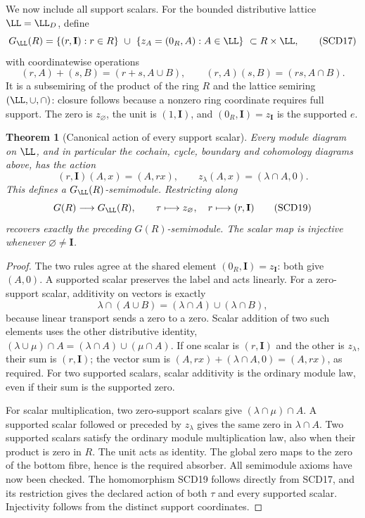 \documentclass[11pt,a4paper]{article}
\newtheorem{theorem}{Theorem}[section]
\theoremstyle{definition}\newtheorem{definition}[theorem]{Definition}
\begin{document}
We now include all support scalars. For the bounded distributive
lattice \(\LL=\LL_D\), define
\[
 G_{\LL}(R)
 =\{(r,\mathbf I):r\in R\}\ \cup\
   \{z_A=(0_R,A):A\in\LL\}\ \subset R\times\LL,
 \tag{SCD17}
\]
with coordinatewise operations
\[
 (r,A)+(s,B)=(r+s,A\cup B),\qquad
 (r,A)(s,B)=(rs,A\cap B).
\]
It is a subsemiring of the product of the ring \(R\) and the lattice
semiring \((\LL,\cup,\cap)\): closure follows because a nonzero
ring coordinate requires full support. The zero is \(z_\varnothing\),
the unit is \((1,\mathbf I)\), and
\((0_R,\mathbf I)=z_{\mathbf I}\) is the supported \(e\).

\begin{theorem}[Canonical action of every support scalar]
Every module diagram on \(\LL\), and in particular the cochain,
cycle, boundary and cohomology diagrams above, has the action
\[
 (r,\mathbf I)(A,x)=(A,rx),\qquad
 z_\lambda(A,x)=(\lambda\cap A,0).
 \tag{SCD18}
\]
This defines a \(G_{\LL}(R)\)-semimodule. Restricting along
\[
 G(R)\longrightarrow G_{\LL}(R),\qquad
 \tau\longmapsto z_\varnothing,\quad
 r\longmapsto(r,\mathbf I)
 \tag{SCD19}
\]
recovers exactly the preceding \(G(R)\)-semimodule.
The scalar map is injective whenever \(\varnothing\ne\mathbf I\).
\end{theorem}
\begin{proof}
The two rules agree at the shared element
\((0_R,\mathbf I)=z_{\mathbf I}\): both give \((A,0)\).
A supported scalar preserves the label and acts linearly. For a
zero-support scalar, additivity on vectors is exactly
\[
 \lambda\cap(A\cup B)=(\lambda\cap A)\cup(\lambda\cap B),
\]
because linear transport sends a zero to a zero. Scalar addition
of two such elements uses the other distributive identity,
\((\lambda\cup\mu)\cap A=(\lambda\cap A)\cup(\mu\cap A)\).
If one scalar is \((r,\mathbf I)\) and the other is \(z_\lambda\),
their sum is \((r,\mathbf I)\); the vector sum is
\((A,rx)+(\lambda\cap A,0)=(A,rx)\), as required.
For two supported scalars, scalar additivity is the ordinary
module law, even if their sum is the supported zero.

For scalar multiplication, two zero-support scalars give
\((\lambda\cap\mu)\cap A\). A supported scalar followed or preceded
by \(z_\lambda\) gives the same zero in \(\lambda\cap A\).
Two supported scalars satisfy the ordinary module multiplication
law, also when their product is zero in \(R\).
The unit acts as identity. The global zero maps to the zero of
the bottom fibre, hence is the required absorber. All semimodule
axioms have now been checked. The homomorphism SCD19 follows
directly from SCD17, and its restriction gives the declared action
of both \(\tau\) and every supported scalar. Injectivity follows
from the distinct support coordinates.
\end{proof}
\end{document}
